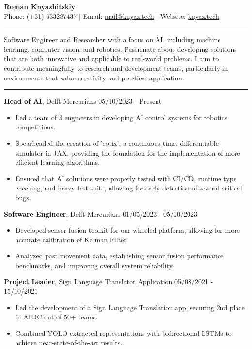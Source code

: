 \documentclass[11pt, a4paper]{article}
\newcommand{\sectiontitle}[1]{\vspace{2mm}{\color{primaryColor}\noindent\textbf{#1}}\vspace{2mm}\hrule\vspace{2mm}}
\newcommand{\experience}[4]{\textbf{#1}, #2 \hfill \vspace{-4mm}#3\\#4\vspace{3mm}}
\begin{document}
\begin{center}
    \LARGE{\textbf{\color{primaryColor}Roman Knyazhitskiy}}\\
    \vspace{1mm}
    \normalsize{Phone: (+31) 633287437 | Email: \href{mailto:mail@knyaz.tech}{mail@knyaz.tech} | Website: \href{https://knyaz.tech}{knyaz.tech}}\\
\end{center}

\sectiontitle{Professional Summary}
\noindent
Software Engineer and Researcher with a focus on AI, including machine learning, computer vision, and robotics. Passionate about developing solutions that are both innovative and applicable to real-world problems. I aim to contribute meaningfully to research and development teams, particularly in environments that value creativity and practical application.

\sectiontitle{Work Experience}
\noindent
\experience{Head of AI}{Delft Mercurians}{05/10/2023 - Present}{
    \begin{itemize}[noitemsep]
        \item Led a team of 3 engineers in developing AI control systems for robotics competitions.
        \item Spearheaded the creation of 'cotix', a continuous-time, differentiable simulator in JAX, providing the foundation for the implementation of more efficient learning algorithms.
        \item Ensured that AI solutions were properly tested with CI/CD, runtime type checking, and heavy test suite, allowing for early detection of several critical bugs.
    \end{itemize}
}
\experience{Software Engineer}{Delft Mercurians}{01/05/2023 - 05/10/2023}{
    \begin{itemize}[noitemsep]
        \item Developed sensor fusion toolkit for our wheeled platform, allowing for more accurate calibration of Kalman Filter.
        \item Analyzed past movement data, establishing sensor fusion performance benchmarks, and improving overall system reliability.
    \end{itemize}
}
\experience{Project Leader}{Sign Language Translator Application}{05/08/2021 - 15/10/2021}{
    \begin{itemize}[noitemsep]
        \item Led the development of a Sign Language Translation app, securing 2nd place in AIIJC out of 50+ teams.
        \item Combined YOLO extracted representations with bidirectional LSTMs to achieve near-state-of-the-art results.
    \end{itemize}
}
\end{document}
